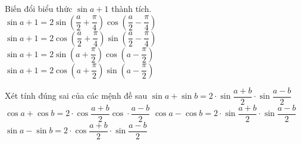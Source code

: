\begin{ex}%
	Biến đổi  biểu thức $\sin a+1$ thành tích.
	\choice 
		{$\sin a+1=2\sin\left(\dfrac{a}{2}+\dfrac{\pi}{4}\right)\cos\left(\dfrac{a}{2}-\dfrac{\pi}{4}\right)$} 
		{$\sin a+1=2\cos\left(\dfrac{a}{2}+\dfrac{\pi}{4}\right)\sin\left(\dfrac{a}{2}-\dfrac{\pi}{4}\right)$} 
		{$\sin  a+1=2\sin\left(a+\dfrac{\pi}{2}\right)\cos\left(a-\dfrac{\pi}{2}\right)$}
		 {\True $\sin a+1=2\cos\left(a+\dfrac{\pi}{2}\right)\sin\left(a-\dfrac{\pi}{2}\right)$}
\end{ex}



\begin{ex}%
	Xét tính đúng sai của các mệnh đề sau 
	\choiceTF 
		{\True $\sin a+\sin  b=2\cdot\sin\dfrac{a+b}{2}\cdot\sin\dfrac{a-b}{2}$}
		{\True $\cos a+\cos  b=2\cdot\cos\dfrac{a+b}{2}\cos\cdot\dfrac{a-b}{2}$}
		{$\cos a-\cos  b=2\cdot\sin\dfrac{a+b}{2}\cdot\sin\dfrac{a-b}{2}$}
		{\True  $\sin a-\sin b=2\cdot\cos\dfrac{a+b}{2}\cdot\sin\dfrac{a-b}{2}$}
\end{ex}

